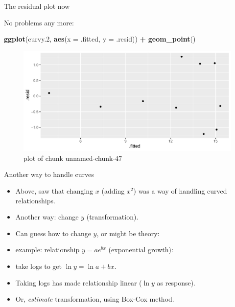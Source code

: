 \documentclass[ignorenonframetext,]{beamer}
\newenvironment{Shaded}{\begin{snugshade}}{\end{snugshade}}
\newcommand{\DataTypeTok}[1]{\textcolor[rgb]{0.13,0.29,0.53}{#1}}
\newcommand{\FloatTok}[1]{\textcolor[rgb]{0.00,0.00,0.81}{#1}}
\newcommand{\KeywordTok}[1]{\textcolor[rgb]{0.13,0.29,0.53}{\textbf{#1}}}
\newcommand{\NormalTok}[1]{#1}
\newcommand{\OperatorTok}[1]{\textcolor[rgb]{0.81,0.36,0.00}{\textbf{#1}}}
\newcommand{\StringTok}[1]{\textcolor[rgb]{0.31,0.60,0.02}{#1}}
\begin{document}
\begin{frame}[fragile]{The residual plot now}
\protect\hypertarget{the-residual-plot-now}{}

No problems any more:

\begin{Shaded}
\begin{Highlighting}[]
\KeywordTok{ggplot}\NormalTok{(curvy}\FloatTok{.2}\NormalTok{, }\KeywordTok{aes}\NormalTok{(}\DataTypeTok{x =}\NormalTok{ .fitted, }\DataTypeTok{y =}\NormalTok{ .resid)) }\OperatorTok{+}\StringTok{ }\KeywordTok{geom_point}\NormalTok{()}
\end{Highlighting}
\end{Shaded}

\begin{figure}
\centering
\includegraphics{figure/unnamed-chunk-47-1.pdf}
\caption{plot of chunk unnamed-chunk-47}
\end{figure}

\end{frame}

\begin{frame}{Another way to handle curves}
\protect\hypertarget{another-way-to-handle-curves}{}

\begin{itemize}
\item
  Above, saw that changing \(x\) (adding \(x^2\)) was a way of handling
  curved relationships.
\item
  Another way: change \(y\) (transformation).
\item
  Can guess how to change \(y\), or might be theory:
\item
  example: relationship \(y=ae^{bx}\) (exponential growth):
\item
  take logs to get \(\ln y=\ln a + bx\).
\item
  Taking logs has made relationship linear (\(\ln y\) as response).
\item
  Or, \emph{estimate} transformation, using Box-Cox method.
\end{itemize}

\end{frame}
\end{document}
